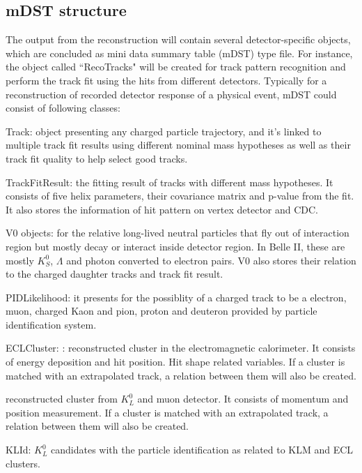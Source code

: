 \subsection{mDST structure}

The output from the reconstruction will contain several detector-specific objects, which are concluded as mini data summary table (mDST) type file. For instance, the object called ``RecoTracks" will be created for track pattern recognition and perform the track fit using the hits from different detectors. Typically for a reconstruction of recorded detector response of a physical event, mDST could consist of following classes: 

\textbullet \space Track: object presenting any charged particle trajectory, and it's linked to multiple track fit results using different nominal mass hypotheses as well as their track fit quality to help select good tracks.  

\textbullet \space TrackFitResult: the fitting result of tracks with different mass hypotheses. It consists of five helix parameters, their covariance matrix and p-value from the fit. It also stores the information of hit pattern on vertex detector and CDC. 

\textbullet \space V0 objects: for the relative long-lived neutral particles that fly out of interaction region but mostly decay or interact inside detector region. In Belle II, these are mostly $K_S^0$, $\Lambda$ and photon converted to electron pairs. V0 also stores their relation to the charged daughter tracks and track fit result. 


\textbullet \space PIDLikelihood: it presents for the possiblity of a charged track to be a electron, muon, charged Kaon and pion, proton and deuteron provided by particle identification system. 

\textbullet \space ECLCluster: : reconstructed cluster in the electromagnetic calorimeter. It consists of energy deposition and hit position. Hit shape related variables. If a cluster is matched with an extrapolated track, a relation between them will also be created. 

\textbullet \space reconstructed cluster from $K_L^0$ and muon detector. It consists of momentum and position measurement. If a cluster is matched with an extrapolated track, a relation between them will also be created. 

\textbullet \space KLId: $K_L^0$ candidates with the particle identification as related to KLM and ECL clusters. 

